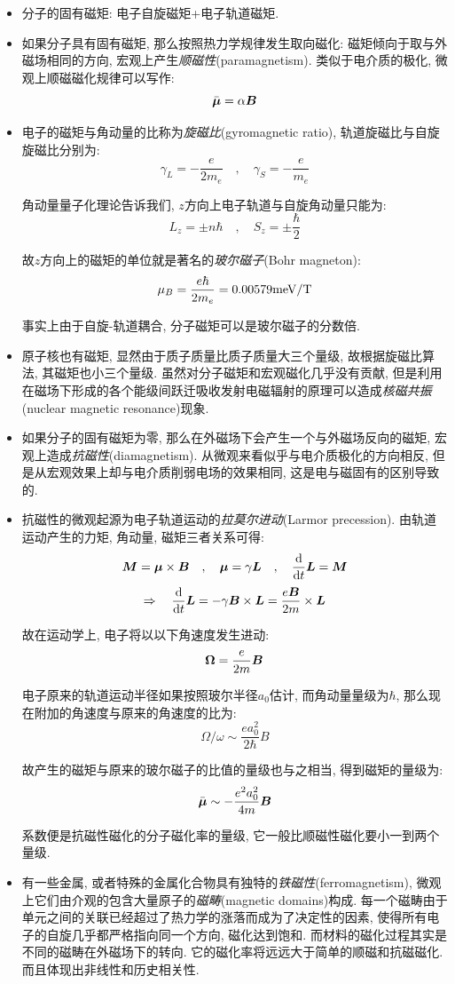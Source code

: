 \begin{itemize}
\item 分子的固有磁矩: 电子自旋磁矩+电子轨道磁矩.
\item 如果分子具有固有磁矩, 那么按照热力学规律发生取向磁化: 磁矩倾向于取与外磁场相同的方向, 宏观上产生\emph{顺磁性}(paramagnetism). 类似于电介质的极化, 微观上顺磁磁化规律可以写作:
\[\bar{\boldsymbol{\mu}}=\alpha \boldsymbol{B}\]
\item 电子的磁矩与角动量的比称为\emph{旋磁比}(gyromagnetic ratio), 轨道旋磁比与自旋旋磁比分别为:
\[\gamma_L=-\frac{e}{2m_e}\quad ,\quad \gamma_S=-\frac{e}{m_e}\]

角动量量子化理论告诉我们, $z$方向上电子轨道与自旋角动量只能为:
\[L_z=\pm n\hbar \quad ,\quad  S_z=\pm \frac{\hbar}{2}\]

故$z$方向上的磁矩的单位就是著名的\emph{玻尔磁子}(Bohr magneton):
\[\mu_B=\frac{e\hbar}{2m_e}=0.00579{\rm meV/T}\]

事实上由于自旋-轨道耦合, 分子磁矩可以是玻尔磁子的分数倍.

\item 原子核也有磁矩, 显然由于质子质量比质子质量大三个量级, 故根据旋磁比算法, 其磁矩也小三个量级. 虽然对分子磁矩和宏观磁化几乎没有贡献, 但是利用在磁场下形成的各个能级间跃迁吸收发射电磁辐射的原理可以造成\emph{核磁共振}(nuclear magnetic resonance)现象.

\item 如果分子的固有磁矩为零, 那么在外磁场下会产生一个与外磁场反向的磁矩, 宏观上造成\emph{抗磁性}(diamagnetism). 从微观来看似乎与电介质极化的方向相反, 但是从宏观效果上却与电介质削弱电场的效果相同, 这是电与磁固有的区别导致的.

\item 抗磁性的微观起源为电子轨道运动的\emph{拉莫尔进动}(Larmor precession). 由轨道运动产生的力矩, 角动量, 磁矩三者关系可得:
\[\boldsymbol{M}=\boldsymbol{\mu}\times \boldsymbol{B}\quad ,\quad  \boldsymbol{\mu}=\gamma \boldsymbol{L}\quad ,\quad  \frac{\textrm{d}}{\textrm{d} t}\boldsymbol{L}=\boldsymbol{M}\]
\[\Rightarrow \quad  \frac{\textrm{d}}{\textrm{d} t}\boldsymbol{L}=-\gamma \boldsymbol{B}\times \boldsymbol{L}=\frac{e\boldsymbol{B}}{2m}\times \boldsymbol{L}\]

故在运动学上, 电子将以以下角速度发生进动:
\[\boldsymbol{\Omega}=\frac{e}{2m}\boldsymbol{B}\]

电子原来的轨道运动半径如果按照玻尔半径$a_0$估计, 而角动量量级为$\hbar$, 那么现在附加的角速度与原来的角速度的比为:
\[\Omega/\omega\sim\frac{ea_0^2}{2\hbar}B\]

故产生的磁矩与原来的玻尔磁子的比值的量级也与之相当, 得到磁矩的量级为:
\[\bar{\boldsymbol{\mu}}\sim-\frac{e^2a_0^2	}{4m}\boldsymbol{B}\]

系数便是抗磁性磁化的分子磁化率的量级, 它一般比顺磁性磁化要小一到两个量级.

\item 有一些金属, 或者特殊的金属化合物具有独特的\emph{铁磁性}(ferromagnetism), 微观上它们由介观的包含大量原子的\emph{磁畴}(magnetic domains)构成. 每一个磁畴由于单元之间的关联已经超过了热力学的涨落而成为了决定性的因素, 使得所有电子的自旋几乎都严格指向同一个方向, 磁化达到饱和. 而材料的磁化过程其实是不同的磁畴在外磁场下的转向. 它的磁化率将远远大于简单的顺磁和抗磁磁化. 而且体现出非线性和历史相关性.


\end{itemize}

